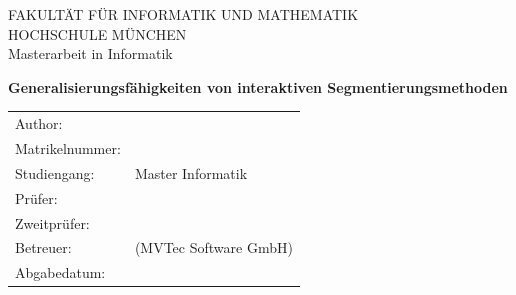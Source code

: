\begin{titlepage}
  \centering
  

  \vspace{15mm}
  {\huge\MakeUppercase{FAKULTÄT FÜR INFORMATIK UND MATHEMATIK}}\\

  \vspace{5mm}
  {\large\MakeUppercase{HOCHSCHULE MÜNCHEN}}\\

  \vspace{20mm}
  {\Large Masterarbeit in Informatik}

  \vspace{15mm}
  {\huge\bfseries Generalisierungsfähigkeiten von interaktiven Segmentierungsmethoden \par}

  \vspace{10mm}
  {\huge\bfseries \foreignlanguage{ngerman}{\getTitleGer{}} \par}

  \vspace{15mm}
  \begin{tabular}{l l}
    Author:          & \getAuthor{} \\
    Matrikelnummer:	 & \getMatrikelNum{} \\
    Studiengang:	 & Master Informatik \\
    Prüfer:      	 & \getSupervisor{}  \\
    Zweitprüfer:	 & \getSecondSupervisor{} \\
    Betreuer:        & \getAdvisor{} (MVTec Software GmbH)\\
    Abgabedatum: 	 & \getSubmissionDate{} \\
  \end{tabular}

 
\end{titlepage}

